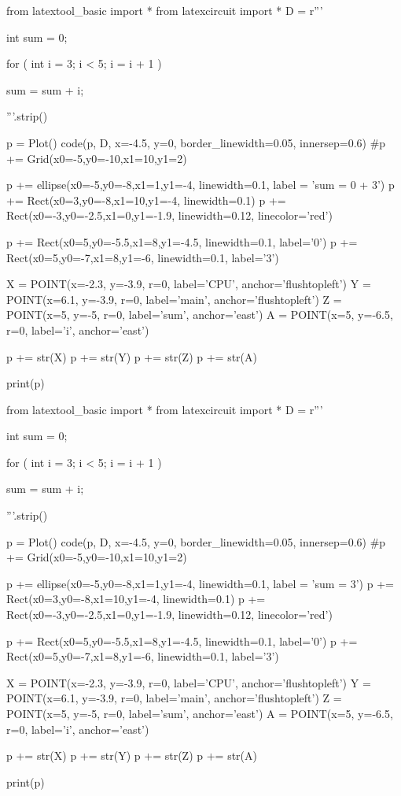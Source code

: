 \begin{python}
from latextool_basic import *
from latexcircuit import *
D = r'''



int sum = 0;

    for ( int i = 3;     i < 5;     i = i + 1 )


        sum = sum + i;



'''.strip()

p = Plot()
code(p, D, x=-4.5, y=0, border_linewidth=0.05, innersep=0.6)
#p += Grid(x0=-5,y0=-10,x1=10,y1=2)

p += ellipse(x0=-5,y0=-8,x1=1,y1=-4, linewidth=0.1, label = 'sum = 0 + 3')
p += Rect(x0=3,y0=-8,x1=10,y1=-4, linewidth=0.1)
p += Rect(x0=-3,y0=-2.5,x1=0,y1=-1.9, linewidth=0.12, linecolor='red')

p += Rect(x0=5,y0=-5.5,x1=8,y1=-4.5, linewidth=0.1, label='0')
p += Rect(x0=5,y0=-7,x1=8,y1=-6, linewidth=0.1, label='3')

X = POINT(x=-2.3, y=-3.9, r=0, label='CPU', anchor='flushtopleft')
Y = POINT(x=6.1, y=-3.9, r=0, label='main', anchor='flushtopleft')
Z = POINT(x=5, y=-5, r=0, label='sum', anchor='east')
A = POINT(x=5, y=-6.5, r=0, label='i', anchor='east')

p += str(X)
p += str(Y)
p += str(Z)
p += str(A)

print(p)
\end{python}

\begin{python}
from latextool_basic import *
from latexcircuit import *
D = r'''



int sum = 0;

    for ( int i = 3;     i < 5;     i = i + 1 )


        sum = sum + i;



'''.strip()

p = Plot()
code(p, D, x=-4.5, y=0, border_linewidth=0.05, innersep=0.6)
#p += Grid(x0=-5,y0=-10,x1=10,y1=2)

p += ellipse(x0=-5,y0=-8,x1=1,y1=-4, linewidth=0.1, label = 'sum = 3')
p += Rect(x0=3,y0=-8,x1=10,y1=-4, linewidth=0.1)
p += Rect(x0=-3,y0=-2.5,x1=0,y1=-1.9, linewidth=0.12, linecolor='red')

p += Rect(x0=5,y0=-5.5,x1=8,y1=-4.5, linewidth=0.1, label='0')
p += Rect(x0=5,y0=-7,x1=8,y1=-6, linewidth=0.1, label='3')

X = POINT(x=-2.3, y=-3.9, r=0, label='CPU', anchor='flushtopleft')
Y = POINT(x=6.1, y=-3.9, r=0, label='main', anchor='flushtopleft')
Z = POINT(x=5, y=-5, r=0, label='sum', anchor='east')
A = POINT(x=5, y=-6.5, r=0, label='i', anchor='east')

p += str(X)
p += str(Y)
p += str(Z)
p += str(A)

print(p)
\end{python}

